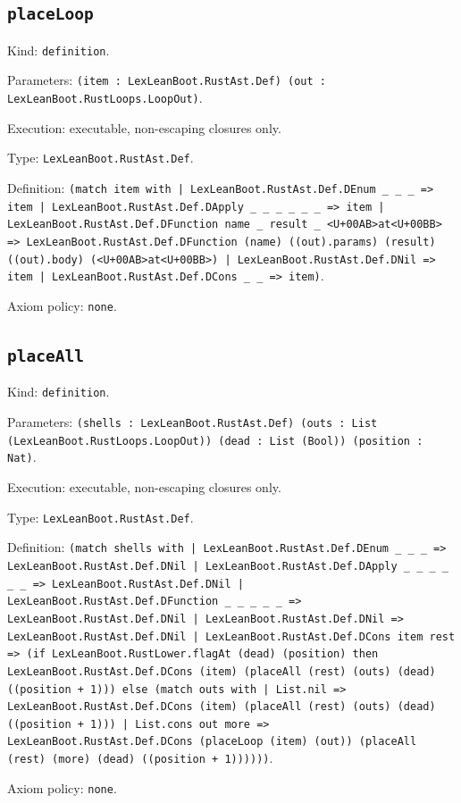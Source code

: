 \documentclass[11pt]{article}
\begin{document}
\subsection*{\texttt{placeLoop}}
\noindent Kind: \texttt{definition}.\par
\noindent Parameters: \texttt{(item : LexLeanBoot.RustAst.Def) (out : LexLeanBoot.RustLoops.LoopOut)}.\par
\noindent Execution: executable, non-escaping closures only.\par
\noindent Type: \texttt{LexLeanBoot.RustAst.Def}.\par
\noindent Definition: \texttt{(match item with | LexLeanBoot.RustAst.Def.DEnum \_ \_ \_ => item | LexLeanBoot.RustAst.Def.DApply \_ \_ \_ \_ \_ \_ => item | LexLeanBoot.RustAst.Def.DFunction name \_ result \_ <U+00AB>at<U+00BB> => LexLeanBoot.RustAst.Def.DFunction (name) ((out).params) (result) ((out).body) (<U+00AB>at<U+00BB>) | LexLeanBoot.RustAst.Def.DNil => item | LexLeanBoot.RustAst.Def.DCons \_ \_ => item)}.\par
\noindent Axiom policy: \texttt{none}.\par
\subsection*{\texttt{placeAll}}
\noindent Kind: \texttt{definition}.\par
\noindent Parameters: \texttt{(shells : LexLeanBoot.RustAst.Def) (outs : List (LexLeanBoot.RustLoops.LoopOut)) (dead : List (Bool)) (position : Nat)}.\par
\noindent Execution: executable, non-escaping closures only.\par
\noindent Type: \texttt{LexLeanBoot.RustAst.Def}.\par
\noindent Definition: \texttt{(match shells with | LexLeanBoot.RustAst.Def.DEnum \_ \_ \_ => LexLeanBoot.RustAst.Def.DNil | LexLeanBoot.RustAst.Def.DApply \_ \_ \_ \_ \_ \_ => LexLeanBoot.RustAst.Def.DNil | LexLeanBoot.RustAst.Def.DFunction \_ \_ \_ \_ \_ => LexLeanBoot.RustAst.Def.DNil | LexLeanBoot.RustAst.Def.DNil => LexLeanBoot.RustAst.Def.DNil | LexLeanBoot.RustAst.Def.DCons item rest => (if LexLeanBoot.RustLower.flagAt (dead) (position) then LexLeanBoot.RustAst.Def.DCons (item) (placeAll (rest) (outs) (dead) ((position + 1))) else (match outs with | List.nil => LexLeanBoot.RustAst.Def.DCons (item) (placeAll (rest) (outs) (dead) ((position + 1))) | List.cons out more => LexLeanBoot.RustAst.Def.DCons (placeLoop (item) (out)) (placeAll (rest) (more) (dead) ((position + 1))))))}.\par
\noindent Axiom policy: \texttt{none}.\par
\end{document}
